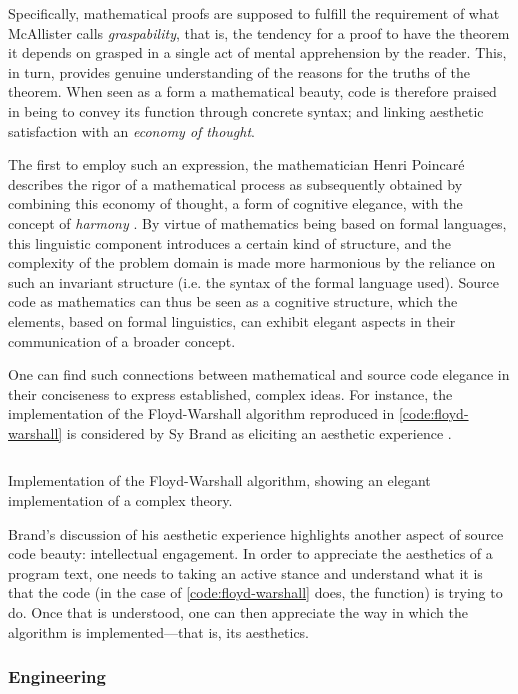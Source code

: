 Specifically, mathematical proofs are supposed to fulfill the requirement of what McAllister calls \emph{graspability}, that is, the tendency for a proof to have the theorem it depends on grasped in a single act of mental apprehension by the reader. This, in turn, provides genuine understanding of the reasons for the truths of the theorem. When seen as a form a mathematical beauty, code is therefore praised in being to convey its function through concrete syntax; and linking aesthetic satisfaction with an \emph{economy of thought}.

The first to employ such an expression, the mathematician Henri Poincaré describes the rigor of a mathematical process as subsequently obtained by combining this economy of thought, a form of cognitive elegance, with the concept of \emph{harmony} \citep{poincare_science_1908}. By virtue of mathematics being based on formal languages, this linguistic component introduces a certain kind of structure, and the complexity of the problem domain is made more harmonious by the reliance on such an invariant structure (i.e. the syntax of the formal language used). Source code as mathematics can thus be seen as a cognitive structure, which the elements, based on formal linguistics, can exhibit elegant aspects in their communication of a broader concept.

One can find such connections between mathematical and source code elegance in their conciseness to express established, complex ideas. For instance, the implementation of the Floyd-Warshall algorithm reproduced in \ref{code:floyd-warshall} is considered by Sy Brand as eliciting an aesthetic experience \citep{cpppconference_keynote_2022}.

\begin{listing}
  \inputminted{perl}{./corpus/floyd_warshall.cpp}
  \caption{Implementation of the Floyd-Warshall algorithm, showing an elegant implementation of a complex theory.}
  \label{code:floyd-warshall}
\end{listing}

Brand's discussion of his aesthetic experience highlights another aspect of source code beauty: intellectual engagement. In order to appreciate the aesthetics of a program text, one needs to taking an active stance and understand what it is that the code (in the case of \ref{code:floyd-warshall} does, the function) is trying to do. Once that is understood, one can then appreciate the way in which the algorithm is implemented—that is, its aesthetics.

\subsubsection{Engineering}
\label{subsubsec:beauty-engineering}

